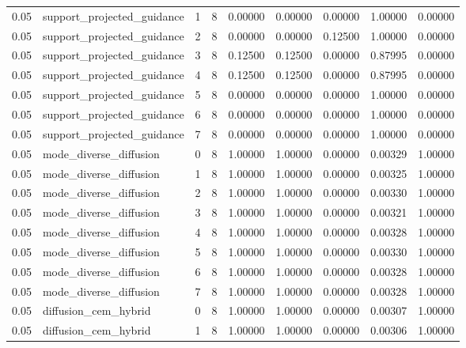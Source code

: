 \documentclass{article}
\begin{document}
\begin{table}[tbp]
{\begin{tabular}{lllllllll}
0.05 & support\_projected\_guidance & 1 & 8 & 0.00000 & 0.00000 & 0.00000 & 1.00000 & 0.00000 \\
0.05 & support\_projected\_guidance & 2 & 8 & 0.00000 & 0.00000 & 0.12500 & 1.00000 & 0.00000 \\
0.05 & support\_projected\_guidance & 3 & 8 & 0.12500 & 0.12500 & 0.00000 & 0.87995 & 0.00000 \\
0.05 & support\_projected\_guidance & 4 & 8 & 0.12500 & 0.12500 & 0.00000 & 0.87995 & 0.00000 \\
0.05 & support\_projected\_guidance & 5 & 8 & 0.00000 & 0.00000 & 0.00000 & 1.00000 & 0.00000 \\
0.05 & support\_projected\_guidance & 6 & 8 & 0.00000 & 0.00000 & 0.00000 & 1.00000 & 0.00000 \\
0.05 & support\_projected\_guidance & 7 & 8 & 0.00000 & 0.00000 & 0.00000 & 1.00000 & 0.00000 \\
0.05 & mode\_diverse\_diffusion & 0 & 8 & 1.00000 & 1.00000 & 0.00000 & 0.00329 & 1.00000 \\
0.05 & mode\_diverse\_diffusion & 1 & 8 & 1.00000 & 1.00000 & 0.00000 & 0.00325 & 1.00000 \\
0.05 & mode\_diverse\_diffusion & 2 & 8 & 1.00000 & 1.00000 & 0.00000 & 0.00330 & 1.00000 \\
0.05 & mode\_diverse\_diffusion & 3 & 8 & 1.00000 & 1.00000 & 0.00000 & 0.00321 & 1.00000 \\
0.05 & mode\_diverse\_diffusion & 4 & 8 & 1.00000 & 1.00000 & 0.00000 & 0.00328 & 1.00000 \\
0.05 & mode\_diverse\_diffusion & 5 & 8 & 1.00000 & 1.00000 & 0.00000 & 0.00330 & 1.00000 \\
0.05 & mode\_diverse\_diffusion & 6 & 8 & 1.00000 & 1.00000 & 0.00000 & 0.00328 & 1.00000 \\
0.05 & mode\_diverse\_diffusion & 7 & 8 & 1.00000 & 1.00000 & 0.00000 & 0.00328 & 1.00000 \\
0.05 & diffusion\_cem\_hybrid & 0 & 8 & 1.00000 & 1.00000 & 0.00000 & 0.00307 & 1.00000 \\
0.05 & diffusion\_cem\_hybrid & 1 & 8 & 1.00000 & 1.00000 & 0.00000 & 0.00306 & 1.00000 \\
\bottomrule
\end{tabular}
}
\end{table}

\clearpage
\end{document}
